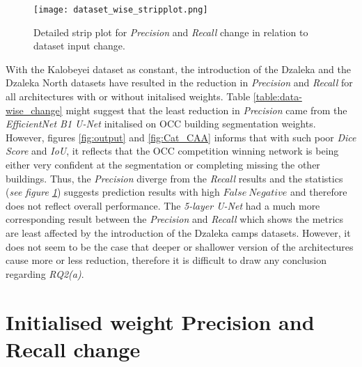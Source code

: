 \documentclass[11pt, a4paper, twoside]{report}
\begin{document}
\begin{figure}[H]
  \centering
  \texttt{[image: dataset\_wise\_stripplot.png]}
  \caption{Detailed strip plot for \textit{Precision} and \textit{Recall} change in relation to dataset input change.}
  \label{fig:data_stripplot}
\end{figure}


With the Kalobeyei dataset as constant, the introduction of the Dzaleka and the Dzaleka North datasets have resulted in the reduction in \textit{Precision} and \textit{Recall} for all architectures with or without initalised weights. Table \ref{table:data-wise_change} might suggest that the least reduction in \textit{Precision} came from the \textit{EfficientNet B1 U-Net} initalised on OCC building segmentation weights. However, figures \ref{fig:output} and \ref{fig:Cat_CAA} informs that with such poor \textit{Dice Score} and \textit{IoU}, it reflects that the OCC competition winning network is being either very confident at the segmentation or completing missing the other buildings. Thus, the \textit{Precision} diverge from the \textit{Recall} results and the statistics (\textit{see figure \ref{fig:data_stripplot}}) suggests prediction results with high $False\ Negative$ and therefore does not reflect overall performance. The \textit{5-layer U-Net} had a much more corresponding result between the \textit{Precision} and \textit{Recall} which shows the metrics are least affected by the introduction of the Dzaleka camps datasets. However, it does not seem to be the case that deeper or shallower version of the architectures cause more or less reduction, therefore it is difficult to draw any conclusion regarding \textit{RQ2(a)}.\\\par

\section{Initialised weight Precision and Recall change}\label{weight_change}
\end{document}
